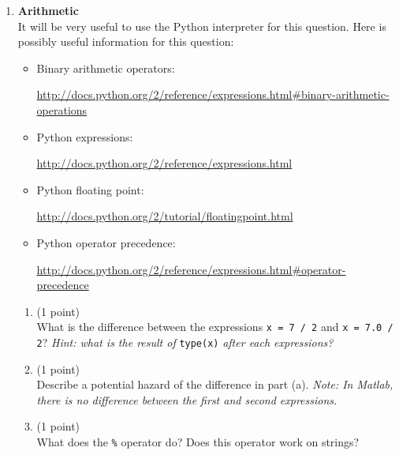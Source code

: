 \documentclass{article}
\newcounter{points}
\newcommand\setpoint{\addtocounter{points}{1}(1 point)}
\begin{document}
\begin{enumerate}
\item \textbf{Arithmetic} \\
It will be very useful to use the Python interpreter for this question.  Here is possibly useful information for this question:
\begin{itemize}
\item Binary arithmetic operators: 

\url{http://docs.python.org/2/reference/expressions.html#binary-arithmetic-operations}

\item Python expressions: 

\url{http://docs.python.org/2/reference/expressions.html}

\item Python floating point:

\url{http://docs.python.org/2/tutorial/floatingpoint.html}

\item Python operator precedence:

\url{http://docs.python.org/2/reference/expressions.html#operator-precedence}
\end{itemize}

\begin{enumerate}
\item \setpoint \\
What is the difference between the expressions \texttt{x = 7 / 2} and \texttt{x = 7.0 / 2}?  \emph{Hint: what is the result of} \texttt{type(x)} \emph{after each expressions?}
\end{enumerate}

\begin{enumerate}
\setcounter{enumii}{1}
\item \setpoint \\
Describe a potential hazard of the difference in part (a).  \emph{Note: In Matlab, there is no difference between the first and second expressions.}
\end{enumerate}

\begin{enumerate}
\setcounter{enumii}{2}
\item \setpoint \\
What does the \texttt{\%} operator do?  Does this operator work on strings?
\end{enumerate}


\end{enumerate}
\end{document}
